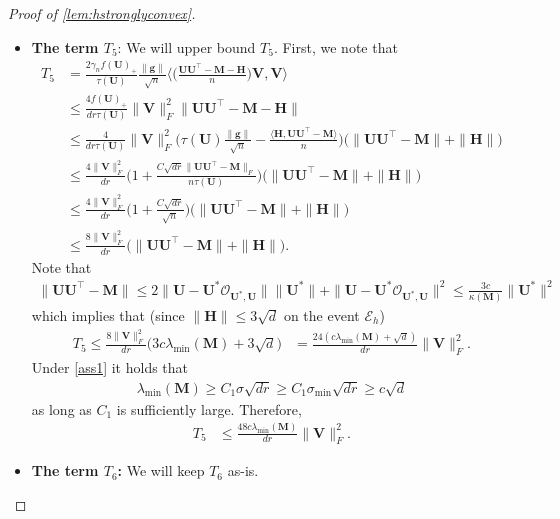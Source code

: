 \documentclass[10pt]{article}
\newcommand{\s}{^*}
\renewcommand{\t}{^{\top}}
\theoremstyle{definition}
\begin{document}
\begin{proof}[Proof of \cref{lem:hstronglyconvex}]
\begin{itemize}
\item \textbf{The term $T_5$}:  We will upper bound $T_5$.  First, we note that
\begin{align}
    T_5 &= \frac{2 \gamma_n f(\bm{U})_+}{\tau(\bm{U})} \frac{\|\bm{g}\|}{\sqrt{n}} \bigg \langle \bigg( \frac{\bm{UU\t - M - H}}{n} \bigg) \bm{V}, \bm{V} \bigg \rangle \\
    &\leq \frac{4 f(\bm{U})_+}{dr \tau(\bm{U})} \| \bm{V} \|_F^2 \| \bm{UU}\t - \bm{M} - \bm{H} \| \\
    &\leq \frac{4}{dr \tau(\bm{U})} \|\bm{V}\|_F^2 \bigg( \tau(\bm{U}) \frac{\|\bm{g}\|}{\sqrt{n}} - \frac{\langle \bm{H}, \bm{UU}\t - \bm{M}\rangle}{n} \bigg) \bigg( \| \bm{UU}\t - \bm{M} \| + \|\bm{H} \| \bigg) \\
    &\leq \frac{ 4\|\bm{V}\|_F^2}{dr} \bigg( 1 + \frac{C\sqrt{dr} \| \bm{UU}\t - \bm{M}\|_F}{n \tau(\bm{U})} \bigg) \bigg( \| \bm{UU}\t - \bm{M} \| + \|\bm{H} \| \bigg) \\
    &\leq  \frac{ 4\|\bm{V}\|_F^2}{dr} \bigg( 1 + \frac{C\sqrt{dr}}{\sqrt{n}} \bigg) \bigg( \| \bm{UU}\t - \bm{M} \| + \|\bm{H} \| \bigg) \\
    &\leq \frac{ 8\|\bm{V}\|_F^2}{dr} \bigg( \| \bm{UU}\t - \bm{M} \| + \| \bm{H} \| \bigg).
\end{align}
Note that
\begin{align}
    \| \bm{UU}\t - \bm{M} \| \leq  2\| \bm{U} - \bm{U}\s \mathcal{O}_{\bm{U}\s,\bm{U}} \| \| \bm{U}\s \| + \| \bm{U} - \bm{U}\s \mathcal{O}_{\bm{U}\s,\bm{U}} \|^2 \leq \frac{3c}{\kappa(\bm{M})} \| \bm{U}\s\|^2
\end{align}
which implies that (since $\|\bm{H} \| \leq 3 \sqrt{d}$ on the event $\mathcal{E}_h$)
\begin{align}
    T_5 \leq  \frac{ 8\|\bm{V}\|_F^2}{dr} \bigg( 3 c\lambda_{\min}(\bm{M}) + 3 \sqrt{d} \bigg) &= \frac{24(c \lambda_{\min}(\bm{M})+ \sqrt{d} )}{dr} \| \bm{V}\|_F^2. %
\end{align}
Under \cref{ass1} it holds that 
\begin{align}
    \lambda_{\min}(\bm{M}) \geq C_1 \sigma \sqrt{dr} \geq C_1 \sigma_{\min} \sqrt{dr} \geq c\sqrt{d}
\end{align}
as long as $C_1$ is sufficiently large.  Therefore,
\begin{align}
    T_5 &\leq \frac{48 c \lambda_{\min}(\bm{M})}{dr} \|\bm{V}\|_F^2.
\end{align}
\item \textbf{The term $T_6$:} We will keep $T_6$ as-is.  
\end{itemize} 

\end{proof}
\end{document}
